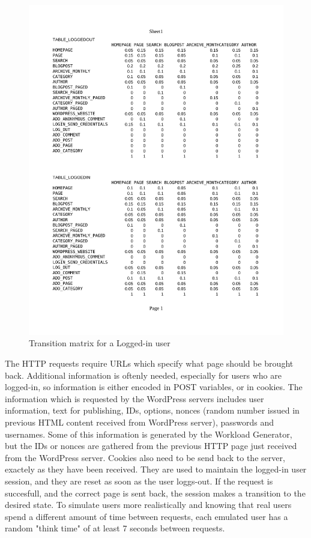   \begin{figure}[t]
    \centering %
    \includegraphics[trim=2cm 14cm 2cm 3.2cm, clip=true, scale=0.85]{src/img/transitionTable.pdf}
    \caption{Transition matrix for a Logged-in user}
    \label{figure:transition-table}
  \end{figure}

The HTTP requests require URLs which specify what page should be brought back. Additional information is oftenly needed, especially for users who are logged-in, so information is either encoded in POST variables, or in cookies. The information which is requested by the WordPress servers includes user information, text for publishing, IDs, options, nonces (random number issued in previous HTML content received from WordPress server), passwords and usernames. Some of this information is generated by the Workload Generator, but the IDs or nonces are gathered from the previous HTTP page just received from the WordPress server. Cookies also need to be send back to the server, exactely as they have been received. They are used to maintain the logged-in user session, and they are reset as soon as the user loggs-out. If the request is succesfull, and the correct page is sent back, the session makes a transition to the desired state. To simulate users more realistically and knowing that real users spend a different amount of time between requests, each emulated user has a random "think time" of at least 7 seconds between requests.


